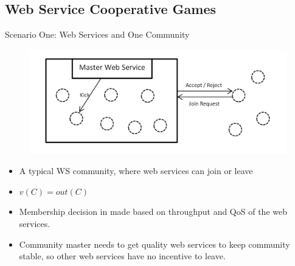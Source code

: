 \documentclass{beamer}
\begin{document}
\subsection{Web Service Cooperative Games}

\begin{frame}{Scenario One: Web Services and One Community}
    \begin{figure}[htbp]
        \centering
        \includegraphics[width=0.8 \columnwidth]{figures/scenario1.png}
    \end{figure}   
    
    \begin{itemize}
        \item A typical WS community, where web services can join or leave
        \item $v(C) = out(C)$
        \item Membership decision in made based on throughput and QoS of the web services.
        \item Community master needs to get quality web services to keep community stable, so other web services have no incentive to leave.
        
    \end{itemize}
       	
\end{frame}
\end{document}
